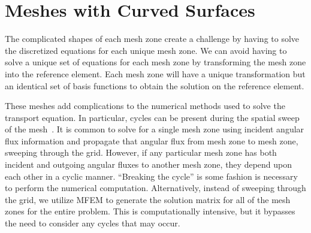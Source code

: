 \documentclass[12pt]{article}
\begin{document}
\section{Meshes with Curved Surfaces}
\label{sec:HOMeshes}
The complicated shapes of each mesh zone create a challenge by having to solve the discretized equations for each unique mesh zone. We can avoid having to solve a unique set of equations for each mesh zone by transforming the mesh zone into the reference element. Each mesh zone will have a unique transformation but an identical set of basis functions to obtain the solution on the reference element.

{\color{red}
These meshes add complications to the numerical methods used to solve the transport equation. In particular, cycles can be present during the spatial sweep of the mesh~\cite{Pautz2002ParallelSweeps,WareingDFEM3DUnsGrid}. It is common to solve for a single mesh zone using incident angular flux information and propagate that angular flux from mesh zone to mesh zone, sweeping through the grid. However, if any particular mesh zone has both incident and outgoing angular fluxes to another mesh zone, they depend upon each other in a cyclic manner. ``Breaking the cycle'' is some fashion is necessary to perform the numerical computation. Alternatively, instead of sweeping through the grid, we utilize MFEM to generate the solution matrix for all of the mesh zones for the entire problem. This is computationally intensive, but it bypasses the need to consider any cycles that may occur.
}

\end{document}
